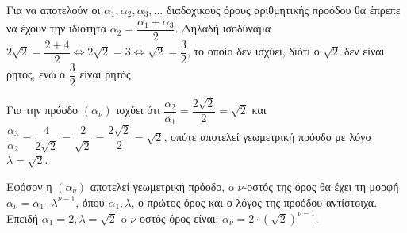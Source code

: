 
\begin{alist}
\item Για να αποτελούν οι $\alpha_1, \alpha_2, \alpha_3, \dots$ διαδοχικούς όρους αριθμητικής προόδου θα έπρεπε να έχουν την ιδιότητα $\alpha_2 = \dfrac{\alpha_1 + \alpha_3}{2}$.
Δηλαδή ισοδύναμα $2\sqrt{2} = \dfrac{2 + 4}{2} \Leftrightarrow 2\sqrt{2} = 3 \Leftrightarrow \sqrt{2} = \dfrac{3}{2}$, το οποίο δεν ισχύει, διότι ο $\sqrt{2}$ δεν είναι ρητός, ενώ ο $\dfrac{3}{2}$ είναι ρητός.

\item Για την πρόοδο $(\alpha_\nu)$ ισχύει ότι $\dfrac{\alpha_2}{\alpha_1} = \dfrac{2\sqrt{2}}{2} = \sqrt{2}$ και $\dfrac{\alpha_3}{\alpha_2} = \dfrac{4}{2\sqrt{2}} = \dfrac{2}{\sqrt{2}} = \dfrac{2\sqrt{2}}{2} = \sqrt{2}$, οπότε
αποτελεί γεωμετρική πρόοδο με λόγο $\lambda = \sqrt{2}$.

Εφόσον η $(\alpha_\nu)$ αποτελεί γεωμετρική πρόοδο, o $\nu$-οστός της όρος θα έχει τη μορφή
$\alpha_\nu = \alpha_1 \cdot \lambda^{\nu-1}$, όπου $\alpha_1, \lambda$, ο πρώτος όρος και ο λόγος της προόδου αντίστοιχα.
Επειδή $\alpha_1 = 2, \lambda = \sqrt{2}$ o $\nu$-οστός όρος είναι: $\alpha_\nu = 2 \cdot (\sqrt{2})^{\nu-1}$.
\end{alist}

